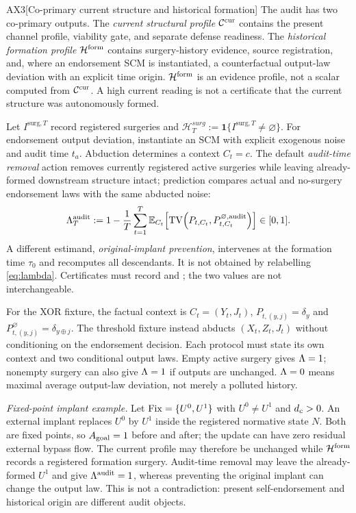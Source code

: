 \begin{axiom}{AX3}[Co-primary current structure and historical formation]
\label{ax:3}
The audit has two co-primary outputs. The \emph{current structural profile}
$\mathcal{C}^{\mathrm{cur}}$ contains the present channel profile, viability gate, and separate
defense readiness. The \emph{historical formation profile} $\mathcal{H}^{\mathrm{form}}$ contains
surgery-history evidence, source registration, and, where an endorsement SCM
is instantiated, a counterfactual output-law deviation with an explicit time
origin. $\mathcal{H}^{\mathrm{form}}$ is an evidence profile, not a scalar computed from $\mathcal{C}^{\mathrm{cur}}$.
A high current reading is not a certificate that the current structure was
autonomously formed.

Let $I^{\mathrm{surg},T}$ record registered surgeries and
$\mathcal H^{surg}_T:=\mathbf 1\{I^{\mathrm{surg},T}\neq\varnothing\}$.
For endorsement output deviation, instantiate an SCM with explicit exogenous
noise and audit time $t_a$. Abduction determines a context $C_t=c$. The
default \emph{audit-time removal} action removes currently registered active
surgeries while leaving already-formed downstream structure intact; prediction
compares actual and no-surgery endorsement laws with the same abducted noise:
\begin{equation}\label{eq:lambda}
\Lambda_T^{\mathrm{audit}}:=1-\frac1T\sum_{t=1}^T\mathbb E_{C_t}\!\left[
\mathrm{TV}\!\left(P_{t,C_t},P_{t,C_t}^{\varnothing,\mathrm{audit}}\right)\right]\in[0,1].
\end{equation}
A different estimand, \emph{original-implant prevention}, intervenes at the
formation time $\tau_0$ and recomputes all descendants. It is not obtained by
relabelling \eqref{eq:lambda}. Certificates must record  and
; the two values are not interchangeable.

For the XOR fixture, the factual context is $C_t=(Y_t,J_t)$,
$P_{t,(y,j)}=\delta_y$ and $P_{t,(y,j)}^{\varnothing}=\delta_{y\oplus j}$.
The threshold fixture instead abducts $(X_t,Z_t,J_t)$ without conditioning on
the endorsement decision. Each protocol must state its own context and two
conditional output laws. Empty active surgery gives $\Lambda=1$; nonempty surgery
can also give $\Lambda=1$ if outputs are unchanged. $\Lambda=0$ means maximal average
output-law deviation, not merely a polluted history.

\emph{Fixed-point implant example.} Let $\mathrm{Fix}=\{U^0,U^1\}$ with $U^0\neq U^1$
and $d_{c}>0$. An external implant replaces $U^0$ by $U^1$ inside the registered
normative state $N$. Both are fixed points, so $A_{\mathrm{goal}}=1$ before and after;
the update can have zero residual external bypass flow. The current profile
may therefore be unchanged while $\mathcal{H}^{\mathrm{form}}$ records a registered formation
surgery. Audit-time removal may leave the already-formed $U^1$ and give
$\Lambda^{\mathrm{audit}}=1$, whereas preventing the original implant can change
the output law. This is not a contradiction: present self-endorsement and
historical origin are different audit objects.


\end{axiom}
